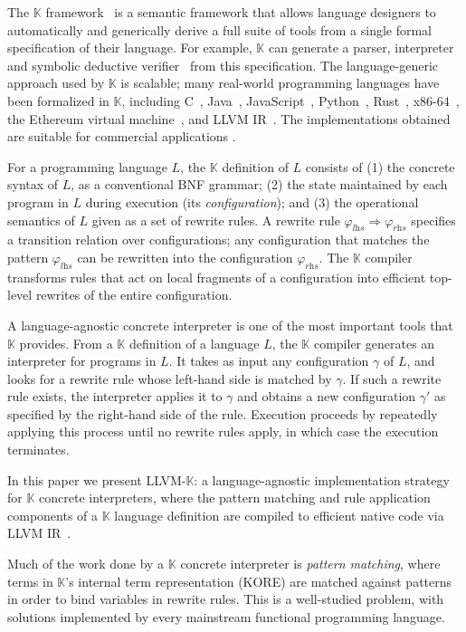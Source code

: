 \documentclass{article}
\theoremstyle{definition}
\newcommand{\K}{$\mathbb{K}$\xspace}
\newcommand{\KL}{LLVM-\K}
\newcommand{\To}{\Rightarrow}
\newcommand{\lhs}{\varphi_\textit{lhs}}
\newcommand{\rhs}{\varphi_\textit{rhs}}
\begin{document}
The \K framework~\cite{RS10} is a semantic framework that allows language
designers to automatically and generically derive a full suite of tools from a
single formal specification of their language. For example, \K can generate a
parser, interpreter and symbolic deductive verifier~\cite{SPY+16} from this
specification.
The
language-generic approach used by \K is scalable; many real-world programming
languages have been formalized in \K, including C~\cite{ECR12},
Java~\cite{BR15}, JavaScript~\cite{Park2015}, Python~\cite{Guth2013},
Rust~\cite{Wang2018}, x86-64~\cite{Dasgupta2019}, the Ethereum virtual
machine~\cite{HSZ+18}, and LLVM IR~\cite{Li2020}. The implementations obtained
are suitable for commercial applications \cite{GHSR16, firefly}. 


For a programming language $L$, the \K definition of $L$ consists of (1) the
concrete syntax of $L$, as a conventional BNF grammar; (2) the state maintained
by each program in $L$ during execution (its \emph{configuration}); and (3) the
operational semantics of $L$ given as a set of rewrite rules. A rewrite rule
$\lhs \To \rhs$ specifies a transition relation over configurations; any
configuration that matches the pattern $\lhs$ can be rewritten into the
configuration $\rhs$. The \K compiler transforms rules that act on local
fragments of a configuration into efficient top-level rewrites of the entire
configuration.

A language-agnostic concrete interpreter is one of the most important tools that
\K provides. From a \K definition of a language $L$, the \K compiler generates
an interpreter for programs in $L$. It takes as input any configuration $\gamma$
of $L$, and looks for a rewrite rule whose left-hand side is matched by
$\gamma$. If such a rewrite rule exists, the interpreter applies it to $\gamma$
and obtains a new configuration $\gamma'$ as specified by the right-hand side of
the rule. Execution proceeds by repeatedly applying this process until no
rewrite rules apply, in which case the execution terminates.



In this paper we present \KL: a language-agnostic implementation strategy for \K
concrete interpreters, where the pattern matching and rule application
components of a \K language definition are compiled to efficient native code via
LLVM IR~\cite{Lattner2004}.

Much of the work done by a \K concrete interpreter is \emph{pattern matching},
where terms in \K's internal term representation (KORE\cite{kore-github}) are matched against
patterns in order to bind variables in rewrite rules. This is a well-studied
problem, with solutions implemented by every mainstream functional programming
language.
\end{document}
